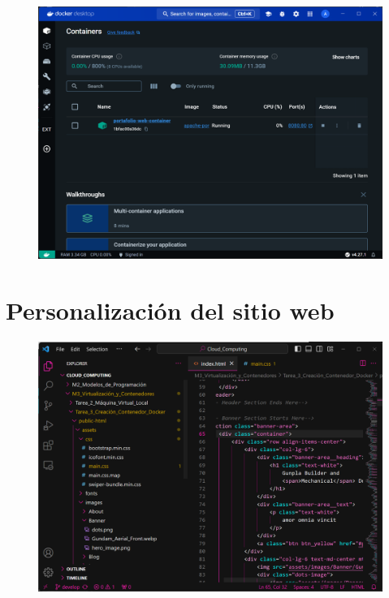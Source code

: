 \documentclass[12pt,a4paper]{article}
\begin{document}
\begin{figure}[H]
    \centering
    \includegraphics[width=1\linewidth]{M3_Virtualización_y_Contenedores/Tarea_3_Creación_Contenedor_Docker/reporte/figuras/4-2_Creación_del_Contenedor.png}
    \label{fig:Creación_Contenedor_2}
\end{figure}


\section{Personalización del sitio web}

\begin{figure}[H]
    \centering
    \includegraphics[width=1\linewidth]{M3_Virtualización_y_Contenedores/Tarea_3_Creación_Contenedor_Docker/reporte/figuras/5-1_Personalización_Sitio_Web.png}
    \label{fig:Personalización_web_1}
\end{figure}
\end{document}
